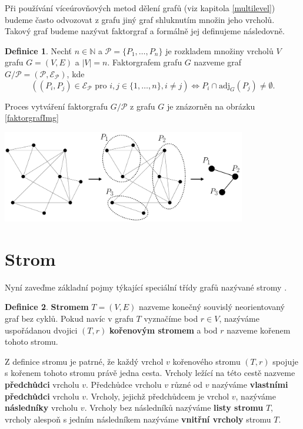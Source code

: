 \documentclass{ctuthesis}
\theoremstyle{plain}
\theoremstyle{definition}
\newtheorem{definition}{Definice}
\begin{document}
\medskip

Při používání víceúrovňových metod dělení grafů (viz kapitola \ref{multilevel}) budeme často odvozovat z grafu jiný graf shluknutím množin jeho vrcholů. Takový graf budeme nazývat faktorgraf a formálně jej definujeme následovně.

\begin{definition}
  Nechť $n\in \mathbb{N}$ a $\mathcal{P} = \{P_1,\ldots,P_n\}$ je rozkladem množiny vrcholů $V$ grafu $G = (V, E)$ a $|V|=n$. Faktorgrafem grafu $G$ nazveme graf $G / \mathcal{P} = (\mathcal{P}, \mathcal{E_P})$, kde 
  \[
    \left(
      (P_i, P_j)\in \mathcal{E_P} \mbox{ pro } i,j \in \{1,\ldots,n\}, i \neq j 
    \right)
    \Leftrightarrow {P_i \cap \mathrm{adj}_G(P_j) \neq \emptyset}
    .
  \]
\end{definition}

Proces vytváření faktorgrafu $G / \mathcal{P}$ z grafu $G$ je znázorněn na obrázku \ref{faktorgrafImg}

\bigskip
{
  \centering
  \includegraphics[width=0.8\textwidth]{pictures/faktorgrafcomplete.pdf}
}

\section{Strom}

Nyní zaveďme základní pojmy týkající speciální třídy grafů nazývané stromy \cite{koub:11}.

\begin{definition}
  \textbf{Stromem} $T=(V,E)$ nazveme konečný souvislý neorientovaný graf bez cyklů. Pokud navíc v grafu $T$ vyznačíme bod $r \in V$, nazýváme uspořádanou dvojici $(T,r)$ \textbf{kořenovým stromem} a bod $r$ nazveme kořenem tohoto stromu.
\end{definition}

Z definice stromu je patrné, že každý vrchol $v$ kořenového stromu $(T,r)$ spojuje s kořenem tohoto stromu právě jedna cesta.
Vrcholy ležící na této cestě nazveme \textbf{předchůdci} vrcholu $v$. Předchůdce vrcholu $v$ různé od $v$ nazýváme \textbf{vlastními předchůdci} vrcholu $v$. Vrcholy, jejichž předchůdcem je vrchol $v$, nazýváme \textbf{následníky} vrcholu $v$. Vrcholy bez následníků nazýváme \textbf{listy stromu} $T$, vrcholy alespoň s jedním následníkem nazýváme \textbf{vnitřní vrcholy} stromu $T$.
\end{document}
